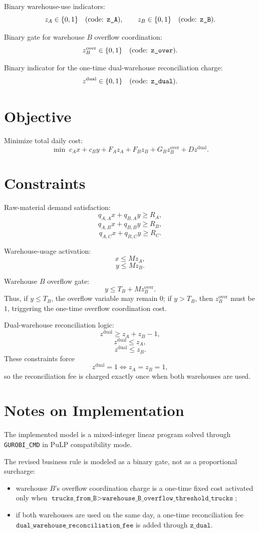 Binary warehouse-use indicators:
\[
z_A \in \{0,1\} \quad \text{(code: \texttt{z\_A})},
\qquad
z_B \in \{0,1\} \quad \text{(code: \texttt{z\_B})}.
\]

Binary gate for warehouse \(B\) overflow coordination:
\[
z^{\text{over}}_B \in \{0,1\} \quad \text{(code: \texttt{z\_over})}.
\]

Binary indicator for the one-time dual-warehouse reconciliation charge:
\[
z^{\text{dual}} \in \{0,1\} \quad \text{(code: \texttt{z\_dual})}.
\]

\section*{Objective}

Minimize total daily cost:
\[
\min \;
c_A x + c_B y + F_A z_A + F_B z_B + G_B z^{\text{over}}_B + D z^{\text{dual}}.
\]

\section*{Constraints}

Raw-material demand satisfaction:
\[
q_{A,A} x + q_{B,A} y \ge R_A,
\]
\[
q_{A,B} x + q_{B,B} y \ge R_B,
\]
\[
q_{A,C} x + q_{B,C} y \ge R_C.
\]

Warehouse-usage activation:
\[
x \le M z_A,
\]
\[
y \le M z_B.
\]

Warehouse \(B\) overflow gate:
\[
y \le T_B + M z^{\text{over}}_B.
\]
Thus, if \(y \le T_B\), the overflow variable may remain \(0\); if \(y > T_B\), then \(z^{\text{over}}_B\) must be \(1\), triggering the one-time overflow coordination cost.

Dual-warehouse reconciliation logic:
\[
z^{\text{dual}} \ge z_A + z_B - 1,
\]
\[
z^{\text{dual}} \le z_A,
\]
\[
z^{\text{dual}} \le z_B.
\]
These constraints force
\[
z^{\text{dual}} = 1 \iff z_A = z_B = 1,
\]
so the reconciliation fee is charged exactly once when both warehouses are used.

\section*{Notes on Implementation}

The implemented model is a mixed-integer linear program solved through \texttt{GUROBI\_CMD} in PuLP compatibility mode.

The revised business rule is modeled as a binary gate, not as a proportional surcharge:
\begin{itemize}
\item warehouse \(B\)'s overflow coordination charge is a one-time fixed cost activated only when \(\texttt{trucks\_from\_B} > \texttt{warehouse\_B\_overflow\_threshold\_trucks}\);
\item if both warehouses are used on the same day, a one-time reconciliation fee \(\texttt{dual\_warehouse\_reconciliation\_fee}\) is added through \(\texttt{z\_dual}\).
\end{itemize}

